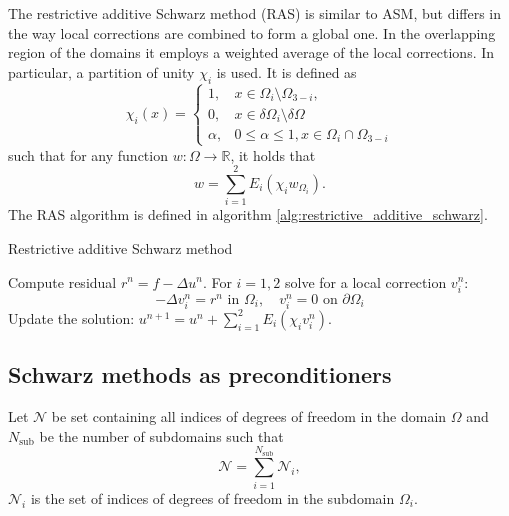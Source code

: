 The restrictive additive Schwarz method (RAS) is similar to ASM, but differs in the way local corrections are combined to form a global one. In the overlapping region of the domains it employs a weighted average of the local corrections. In particular, a partition of unity $\chi_i$ is used. It is defined as
\[
    \chi_i(x)=
    \begin{cases}
        1,      & x \in \Omega_i \setminus \Omega_{3-i},                 \\
        0,      & x \in \delta \Omega_i \setminus \delta \Omega          \\
        \alpha, & 0 \leq \alpha \leq 1, x \in \Omega_i \cap \Omega_{3-i}
    \end{cases}
\]
such that for any function $w: \Omega \rightarrow \mathbb{R}$, it holds that
\[
    w = \sum_{i=1}^{2}E_i(\chi_i w_{\Omega_i}).
\]
The RAS algorithm is defined in algorithm \ref{alg:restrictive_additive_schwarz}.
\begin{algorithm}[H]
    \caption{Restrictive additive Schwarz method \cite[Algorithm 1.1]{schwarz_methods_Dolean_2015}}
    \label{alg:restrictive_additive_schwarz}
    \begin{algorithmic}
        \State Compute residual $r^n=f-\Delta u^n$.
        \State For $i=1,2$ solve for a local correction $v_i^n$:
        \[
            -\Delta v_i^n=r^n \text{ in } \Omega_i, \quad v_i^n=0 \text{ on } \partial \Omega_i
        \]
        \State Update the solution: $u^{n+1}=u^n + \sum_{i=1}^{2}E_i(\chi_i v_i^n)$.
    \end{algorithmic}
\end{algorithm}


\subsection{Schwarz methods as preconditioners}
Let $\mathcal{N}$ be set containing all indices of degrees of freedom in the domain $\Omega$ and $N_{\text{sub}}$ be the number of subdomains such that
\[
    \mathcal{N}=\sum_{i=1}^{N_{\text{sub}}} \mathcal{N}_i,
\]
$\mathcal{N}_i$ is the set of indices of degrees of freedom in the subdomain $\Omega_i$.

